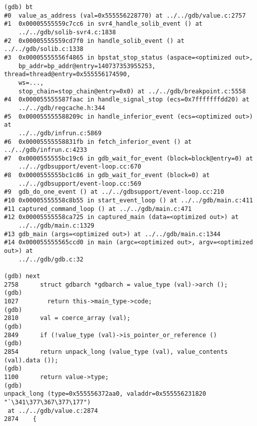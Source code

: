 \documentclass{report}
\begin{document}
\begin{verbatim}
(gdb) bt
#0  value_as_address (val=0x555556228770) at ../../gdb/value.c:2757
#1  0x00005555559c7cc6 in svr4_handle_solib_event () at 
    ../../gdb/solib-svr4.c:1838
#2  0x00005555559cd7f0 in handle_solib_event () at ../../gdb/solib.c:1338
#3  0x00005555556f4865 in bpstat_stop_status (aspace=<optimized out>, 
    bp_addr=bp_addr@entry=140737353955253, thread=thread@entry=0x555556174590, 
    ws=..., 
    stop_chain=stop_chain@entry=0x0) at ../../gdb/breakpoint.c:5558
#4  0x000055555587faac in handle_signal_stop (ecs=0x7fffffffdd20) at 
    ../../gdb/regcache.h:344
#5  0x000055555588209c in handle_inferior_event (ecs=<optimized out>) at 
    ../../gdb/infrun.c:5869
#6  0x00005555558831fb in fetch_inferior_event () at ../../gdb/infrun.c:4233
#7  0x0000555555bc19c6 in gdb_wait_for_event (block=block@entry=0) at 
    ../../gdbsupport/event-loop.cc:670
#8  0x0000555555bc1c86 in gdb_wait_for_event (block=0) at 
    ../../gdbsupport/event-loop.cc:569
#9  gdb_do_one_event () at ../../gdbsupport/event-loop.cc:210
#10 0x00005555558c8b55 in start_event_loop () at ../../gdb/main.c:411
#11 captured_command_loop () at ../../gdb/main.c:471
#12 0x00005555558ca725 in captured_main (data=<optimized out>) at 
    ../../gdb/main.c:1329
#13 gdb_main (args=<optimized out>) at ../../gdb/main.c:1344
#14 0x000055555565ccd0 in main (argc=<optimized out>, argv=<optimized out>) at 
    ../../gdb/gdb.c:32

(gdb) next
2758	  struct gdbarch *gdbarch = value_type (val)->arch ();
(gdb) 
1027	    return this->main_type->code;
(gdb) 
2810	  val = coerce_array (val);
(gdb) 
2849	  if (!value_type (val)->is_pointer_or_reference ()
(gdb) 
2854	  return unpack_long (value_type (val), value_contents (val).data ());
(gdb) 
1100	  return value->type;
(gdb) 
unpack_long (type=0x555556372aa0, valaddr=0x555556231820 "`\341\377\367\377\177")
 at ../../gdb/value.c:2874
2874	{


\end{verbatim}
\end{document}
